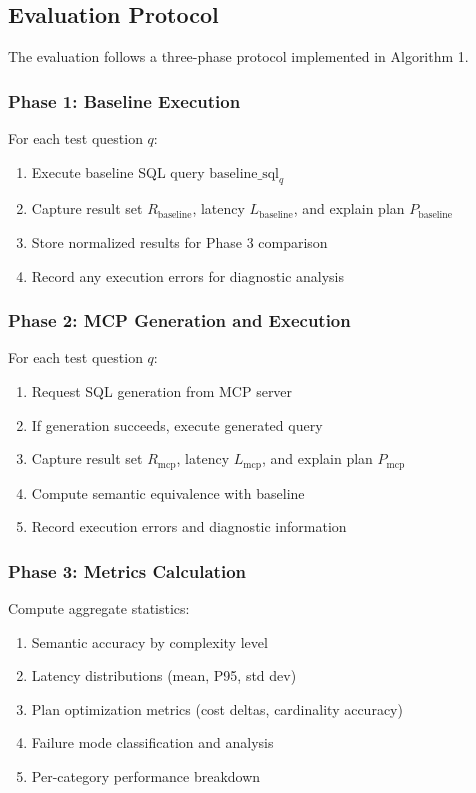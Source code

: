 \subsection{Evaluation Protocol}



The evaluation follows a three-phase protocol implemented in Algorithm 1.

\subsubsection{Phase 1: Baseline Execution}
For each test question $q$:
\begin{enumerate}
    \item Execute baseline SQL query $\text{baseline\_sql}_q$
    \item Capture result set $R_{\text{baseline}}$, latency $L_{\text{baseline}}$, and explain plan $P_{\text{baseline}}$
    \item Store normalized results for Phase 3 comparison
    \item Record any execution errors for diagnostic analysis
\end{enumerate}

\subsubsection{Phase 2: MCP Generation and Execution}
For each test question $q$:
\begin{enumerate}
    \item Request SQL generation from MCP server
    \item If generation succeeds, execute generated query
    \item Capture result set $R_{\text{mcp}}$, latency $L_{\text{mcp}}$, and explain plan $P_{\text{mcp}}$
    \item Compute semantic equivalence with baseline
    \item Record execution errors and diagnostic information
\end{enumerate}

\subsubsection{Phase 3: Metrics Calculation}
Compute aggregate statistics:
\begin{enumerate}
    \item Semantic accuracy by complexity level
    \item Latency distributions (mean, P95, std dev)
    \item Plan optimization metrics (cost deltas, cardinality accuracy)
    \item Failure mode classification and analysis
    \item Per-category performance breakdown
\end{enumerate}

